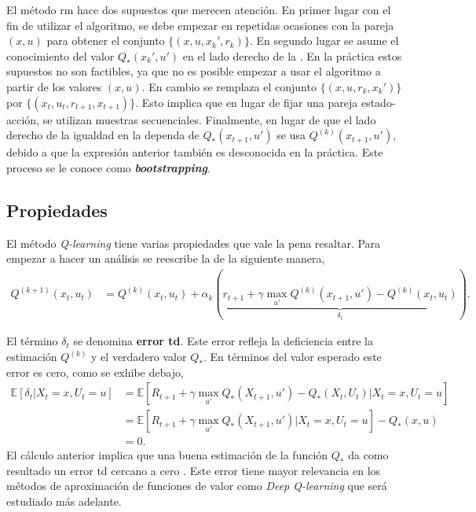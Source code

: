 El método \acrshort{rm} hace dos supuestos que merecen atención. En primer lugar con el fin de utilizar el algoritmo, se debe empezar en repetidas ocasiones con la pareja $(x, u)$ para obtener el conjunto $\{(x, u, x_k', r_k)\}$. En segundo lugar se asume el conocimiento del valor $Q_{*}(x_k', u')$ en el lado derecho de la . En la práctica estos supuestos no son factibles, ya que no es posible empezar a usar el algoritmo a partir de los valores $(x, u)$. En cambio se remplaza el conjunto $\{(x, u, r_k, x_k')\}$ por $\{(x_t, u_t, r_{t+1}, x_{t+1})\}$. Esto implica que en lugar de fijar una pareja estado-acción, se utilizan muestras secuenciales. Finalmente, en lugar de que el lado derecho de la igualdad en la  dependa de $Q_{*}(x_{t+1}, u')$ se usa $Q^{(k)}(x_{t+1}, u')$, debido a que la expresión anterior también es desconocida en la práctica. Este proceso se le conoce como \textbf{\textit{bootstrapping}}. \cite{Shiyu2022}

\subsection{Propiedades}
El método \textit{Q-learning} tiene varias propiedades que vale la pena resaltar. Para empezar a hacer un análisis se reescribe la  de la siguiente manera, 
\begin{align}
    Q^{(k+1)}(x_t, u_t) &= Q^{(k)}(x_t, u_t) + \alpha_k \left(\underbrace{
    r_{t+1} + \gamma \max_{u'}Q^{(k)}(x_{t+1}, u')  - Q^{(k)}(x_t, u_t)}_{\delta_{t}}\right).
\end{align}

El término $\delta_t$ se denomina \textbf{error \acrshort{td}}. Este error refleja la deficiencia entre la estimación $Q^{(k)}$ y el verdadero valor $Q_{*}$. En términos del valor esperado este error es cero, como se exhibe debajo, 
\begin{equation}
\begin{aligned}
        \mathbb{E}[\delta_{t}|X_t=x, U_t=u] &= \mathbb{E}[R_{t+1} + \gamma\max_{u'}Q_{*}(X_{t+1}, u')- Q_{*}(X_t, U_t)|X_t=x, U_t=u] \\
    &= \mathbb{E}[R_{t+1} + \gamma\max_{u'}Q_{*}(X_{t+1}, u')|X_t=x, U_t=u] 
    - Q_{*}(x, u) \\
    &= 0.
\end{aligned}
\end{equation}
El cálculo anterior implica que una buena estimación de la función $Q_{*}$ da como resultado un error \acrshort{td} cercano a cero \cite{Shiyu2022}. Este error tiene mayor relevancia en los métodos de aproximación de funciones de valor como \textit{Deep Q-learning} que será estudiado más adelante.

